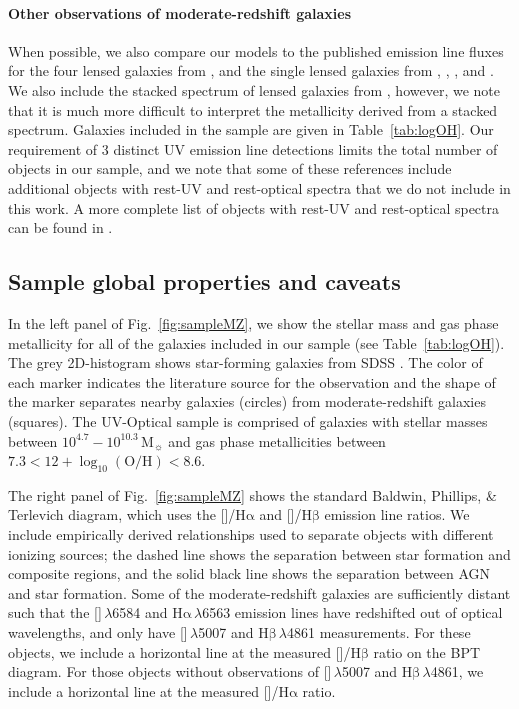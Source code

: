 \documentclass[trackchanges, preprint2]{aastex62}
\newcommand{\nii}{[\ion{N}{2}]}
\newcommand{\oiii}{[\ion{O}{3}]}
\newcommand\Msun{\ensuremath{\mathrm{M_{\sun}}}\xspace}
\newcommand{\ha}{\ensuremath{\mathrm{H\alpha}}\xspace}
\newcommand{\hb}{\ensuremath{\mathrm{H\beta}}\xspace}
\newcommand{\logten}{\ensuremath{\log_{10}}}
\newcommand{\logOH}{\ensuremath{\logten (\mathrm{O}/\mathrm{H})}\xspace}
\begin{document}
\paragraph{Other observations of moderate-redshift galaxies} When possible, we also compare our models to the published emission line fluxes for the four lensed galaxies from \citet{Stark+2014}, and the single lensed galaxies from \citet{Erb+2010}, \citet{Christensen+2012}, \citet{Bayliss+2014}, and \citet{Berg+2018}. We also include the stacked spectrum of lensed galaxies from \citet{Steidel+2016}, however, we note that it is much more difficult to interpret the metallicity derived from a stacked spectrum. Galaxies included in the sample are given in Table~\ref{tab:logOH}. Our requirement of 3 distinct UV emission line detections limits the total number of objects in our sample, and we note that some of these references include additional objects with rest-UV and rest-optical spectra \citep[e.g.,][]{Christensen+2012} that we do not include in this work. A more complete list of objects with rest-UV and rest-optical spectra can be found in \citet{Patricio+2019}.

\subsection{Sample global properties and caveats}\label{sec:data:caveats}

In the left panel of Fig.~\ref{fig:sampleMZ}, we show the stellar mass and gas phase metallicity for all of the galaxies included in our sample (see Table~\ref{tab:logOH}). The grey 2D-histogram shows star-forming galaxies from SDSS \citep[DR7;][]{Abazajian+2009}. The color of each marker indicates the literature source for the observation and the shape of the marker separates nearby galaxies (circles) from moderate-redshift galaxies (squares). The UV-Optical sample is comprised of galaxies with stellar masses between $10^{4.7} - 10^{10.3}$\,\Msun and gas phase metallicities between $7.3 < 12+\logOH < 8.6$.

The right panel of Fig.~\ref{fig:sampleMZ} shows the standard Baldwin, Phillips, \& Terlevich \citep[BPT;][]{BPT} diagram, which uses the \nii{}/\ha{} and \oiii{}/\hb{} emission line ratios. We include empirically derived relationships used to separate objects with different ionizing sources; the dashed line shows the \citet{Kauffmann+2003b} separation between star formation and composite regions, and the solid black line shows the \citet{Kewley+2001} separation between AGN and star formation. Some of the moderate-redshift galaxies are sufficiently distant such that the \nii{}$\,\lambda$6584 and \ha{}$\,\lambda$6563 emission lines have redshifted out of optical wavelengths, and only have \oiii{}$\,\lambda$5007 and \hb{}$\,\lambda$4861 measurements. For these objects, we include a horizontal line at the measured \oiii{}/\hb{} ratio on the BPT diagram. For those objects without observations of \oiii{}$\,\lambda$5007 and \hb{}$\,\lambda$4861, we include a horizontal line at the measured \nii{}/\ha{} ratio.
\end{document}
